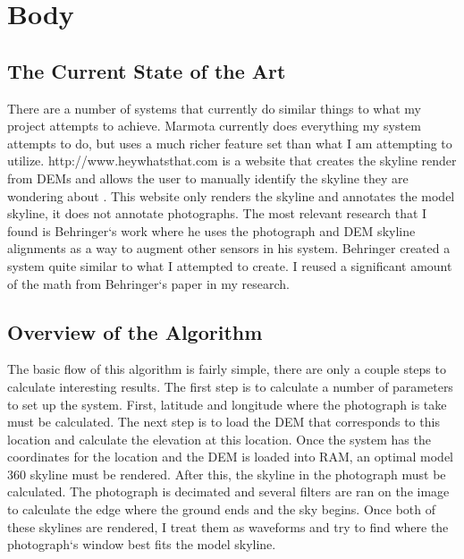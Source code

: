 \documentclass{acm_proc_article-sp}
\begin{document}
\section{Body}
\subsection{The Current State of the Art}
There are a number of systems that currently do similar things to what my project attempts to achieve.  Marmota currently does everything my system attempts to do, but uses a much richer feature set than what I am attempting to utilize.\cite{chippendale2009environmental, chippendale2009spatial} http://www.heywhatsthat.com is a website that creates the skyline render from DEMs and allows the user to manually identify the skyline they are wondering about \cite{wong2008we, heywhatsthat}.  This website only renders the skyline and annotates the model skyline, it does not annotate photographs.  The most relevant research that I found is Behringer`s work \cite{behringer2002registration} where he uses the photograph and DEM skyline alignments as a way to augment other sensors in his system.  Behringer created a system quite similar to what I attempted to create. I reused a significant amount of the math from Behringer`s paper in my research.

\subsection{Overview of the Algorithm}
	The basic flow of this algorithm is fairly simple, there are only a couple steps to calculate interesting results.  The first step is to calculate a number of parameters to set up the system.  First, latitude and longitude where the photograph is take must be calculated.  The next step is to load the DEM that corresponds to this location and calculate the elevation at this location.  Once the system has the coordinates for the location and the DEM is loaded into RAM, an optimal model 360 skyline must be rendered. 
	After this, the skyline in the photograph must be calculated.  The photograph is decimated and several filters are ran on the image to calculate the edge where the ground ends and the sky begins. Once both of these skylines are rendered, I treat them as waveforms \cite{Schafer:DSP} and try to find where the photograph`s window best fits the model skyline. 
\end{document}
